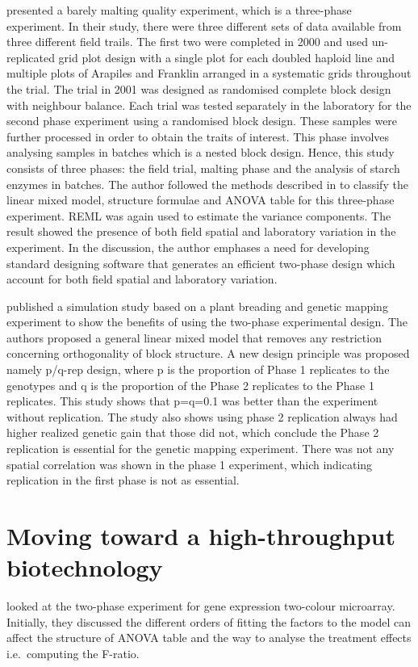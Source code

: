 \documentclass[11pt,a4paper]{article}
\begin{document}
\cite{Cullis2003} presented a barely malting quality experiment, which is a three-phase experiment. In their study, there were three different sets of data available from three different field trails. The first two were completed in 2000 and used un-replicated grid plot design with a single plot for each doubled haploid line and multiple plots of Arapiles and Franklin arranged in a systematic grids throughout the trial. The trial in 2001 was designed as randomised complete block design with neighbour balance. Each trial was tested separately in the laboratory for the second phase experiment using a randomised block design. These samples were further processed in order to obtain the traits of interest. This phase involves analysing samples in batches which is a nested block design. Hence, this study consists of three phases: the field trial, malting phase and the analysis of starch enzymes in batches. The author followed the methods described in \cite{Brien1983} to classify the linear mixed model, structure formulae and ANOVA table for this three-phase experiment. REML was again used to estimate the variance components. The result showed the presence of both field spatial and laboratory variation in the experiment. In the discussion, the author emphases a need for developing standard designing software that generates an efficient two-phase design which account for both field spatial and laboratory variation. 
 	
\cite{Smith2006} published a simulation study based on a plant breading and genetic mapping experiment to show the benefits of using the two-phase experimental design. The authors proposed a general linear mixed model that removes any restriction concerning orthogonality of block structure. A new design principle was proposed namely p/q-rep design, where p is the proportion of Phase 1 replicates to the genotypes and q is the proportion of the Phase 2 replicates to the Phase 1 replicates. This study shows that p=q=0.1 was better than the experiment without replication. The study also shows using phase 2 replication always had higher realized genetic gain that those did not, which conclude the Phase 2 replication is essential for the genetic mapping experiment. There was not any spatial correlation was shown in the phase 1 experiment, which indicating replication in the first phase is not as essential. 

\section{Moving toward a high-throughput biotechnology }
\cite{Jarrett2008} looked at the two-phase experiment for gene expression two-colour microarray. Initially, they discussed the different orders of fitting the factors to the model can affect the structure of ANOVA table and the way to analyse the treatment effects i.e.\ computing the F-ratio.
\end{document}
